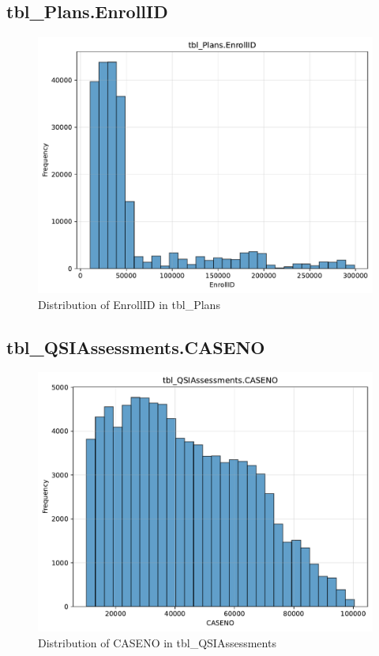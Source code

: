 \subsection{tbl\_Plans.EnrollID}

\begin{figure}[htbp]
\centering
\includegraphics[width=\textwidth]{figures/dbo_tbl_Plans_EnrollID.pdf}
\caption{Distribution of EnrollID in tbl\_Plans}
\end{figure}\newpage

\subsection{tbl\_QSIAssessments.CASENO}

\begin{figure}[htbp]
\centering
\includegraphics[width=\textwidth]{figures/dbo_tbl_QSIAssessments_CASENO.pdf}
\caption{Distribution of CASENO in tbl\_QSIAssessments}
\end{figure}\newpage


